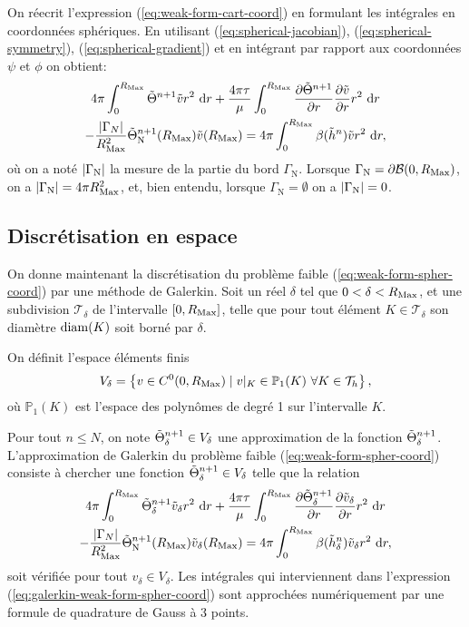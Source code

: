 On réecrit l'expression (\ref{eq:weak-form-cart-coord}) en formulant
les intégrales en coordonnées sphériques. En utilisant
(\ref{eq:spherical-jacobian}), (\ref{eq:spherical-symmetry}),
(\ref{eq:spherical-gradient}) et en intégrant par rapport aux
coordonnées $\psi$ et $\phi$ on obtient:
\begin{multline}\label{eq:weak-form-spher-coord}
  4\pi\int_0^{\rmax} \tilde \temperature^{n+1}\tilde v r^2\,\intd{r}
  + \frac{4\pi\tau}{\mu}\int_0^{\rmax} \frac{\partial %
    \tilde \temperature^{n+1}}{\partial r} \frac{\partial \tilde v}{\partial %
    r}r^2\,\intd{r} \\
  - \frac{\abs{\Gamma_N}}{\rmax^2}\tilde\temperature^{n+1}_\mathrm{N}(\rmax)\tilde v(\rmax) %
  = 4\pi\int_0^{\rmax} \beta(\tilde \enthalpydensity^n)\tilde v r^2\,\intd{r},
\end{multline}
où on a noté $\left\lvert \Gamma_\mathrm{N} \right\rvert$ la mesure de la partie du bord
$\Gamma_\mathrm{N}$. Lorsque $\Gamma_\mathrm{N} = \partial
\mathcal B(0, R_\mathrm{Max})$, on a $\left\lvert \Gamma_\mathrm{N} \right\rvert = 4\pi R_\mathrm{Max}^2$,
et, bien entendu, lorsque $\Gamma_\mathrm{N} = \emptyset$ on a
$\left\lvert \Gamma_\mathrm{N} \right\rvert = 0$.


\subsection*{Discrétisation en espace}
On donne maintenant la discrétisation du problème faible
(\ref{eq:weak-form-spher-coord}) par une méthode de Galerkin. Soit un
réel $\delta$ tel que $0 < \delta < R_\mathrm{Max}$, et une subdivision
$\mathcal T_\delta$ de l'intervalle $[0, R_\mathrm{Max}]$, telle que pour tout
élément $K\in\mathcal T_\delta$ son diamètre $\operatorname{diam}(K)$ soit borné par
$\delta$.

On définit l'espace éléments finis
\begin{equation}
V_\delta = \left\{ v \in C^0(0, R_\mathrm{Max})\mid v\vert_K \in \mathbb
  P_1(K)\ \forall K\in\mathcal T_h \right\},
\end{equation}
où $\mathbb P_1(K)$ est l'espace des polynômes de degré 1 sur
l'intervalle $K$.

Pour tout $n \leq N$, on note $\tilde {\Theta}_\delta^{n+1} \in
V_\delta$ une approximation de la fonction $\tilde {\Theta}_\delta^{n+1}$.
L'approximation de Galerkin du problème faible (\ref{eq:weak-form-spher-coord})
consiste à chercher une fonction $\tilde {\Theta}_\delta^{n+1} \in
V_\delta$ telle que la relation
\begin{multline}\label{eq:galerkin-weak-form-spher-coord}
  4\pi\int_0^{\rmax} \tilde \temperature_\delta^{n+1}\tilde v_\delta r^2\,\intd{r}
  + \frac{4\pi\tau}{\mu}\int_0^{\rmax} \frac{\partial %
    \tilde \temperature_\delta^{n+1}}{\partial r} \frac{\partial \tilde v_\delta}{\partial %
    r}r^2\,\intd{r} \\
  - \frac{\abs{\Gamma_N}}{\rmax^2}\tilde\temperature^{n+1}_\mathrm{N}(\rmax)\tilde v_\delta(\rmax) %
  = 4\pi\int_0^{\rmax} \beta(\tilde \enthalpydensity_\delta^n)\tilde v_\delta r^2\,\intd{r},
\end{multline}
soit vérifiée pour tout $v_\delta \in V_\delta$. Les intégrales qui
interviennent dans l'expression
(\ref{eq:galerkin-weak-form-spher-coord}) sont approchées
numériquement par une formule de quadrature de Gauss à 3 points.

